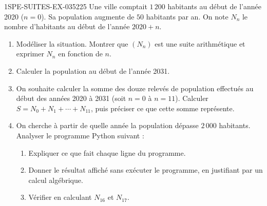 \begin{exercice}{1SPE-SUITES-EX-035}{2}{25}
Une ville comptait $1\,200$ habitants au début de l'année 2020 ($n = 0$). Sa population augmente de $50$ habitants par an. On note $N_n$ le nombre d'habitants au début de l'année $2020 + n$.

\begin{enumerate}
  \item Modéliser la situation. Montrer que $(N_n)$ est une suite arithmétique et exprimer $N_n$ en fonction de $n$.

  \item Calculer la population au début de l'année 2031.

  \item On souhaite calculer la somme des douze relevés de population effectués au début des années 2020 à 2031 (soit $n = 0$ à $n = 11$). Calculer $S = N_0 + N_1 + \cdots + N_{11}$, puis préciser ce que cette somme représente.

  \item On cherche à partir de quelle année la population dépasse $2\,000$ habitants. Analyser le programme Python suivant :

\medskip


\medskip
  \begin{enumerate}
    \item Expliquer ce que fait chaque ligne du programme.
    \item Donner le résultat affiché sans exécuter le programme, en justifiant par un calcul algébrique.
    \item Vérifier en calculant $N_{16}$ et $N_{17}$.
  \end{enumerate}
\end{enumerate}
\end{exercice}
